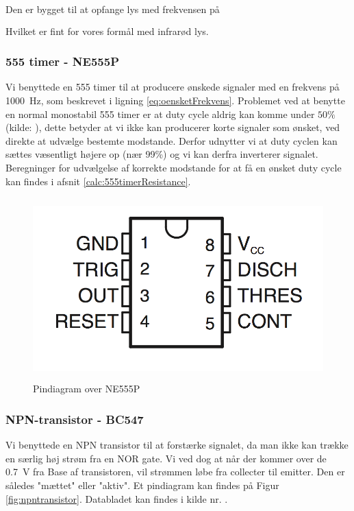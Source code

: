Den er bygget til at opfange lys med frekvensen på
\begin{align}
	 [\SI{730}{nm};\SI{1100}{nm}] \\
\end{align}
Hvilket er fint for vores formål med infrarød lys.
\subsubsection{555 timer - NE555P}
Vi benyttede en 555 timer\cite{komp555} til at producere ønskede signaler med en frekvens på \SI{1000}{Hz}, som beskrevet i ligning \ref{eq:oensketFrekvens}.
Problemet ved at benytte en normal monostabil 555 timer er at duty cycle aldrig kan komme under $50\%$ (kilde: \cite{555timer50percent}), dette betyder at vi ikke kan producerer korte signaler som ønsket, ved direkte at udvælge bestemte modstande. Derfor udnytter vi at duty cyclen kan sættes væsentligt højere op (nær 99\%) og vi kan derfra inverterer signalet. Beregninger for udvælgelse af korrekte modstande for at få en ønsket duty cycle kan findes i afsnit \ref{calc:555timerResistance}.

\begin{figure}[H]
	\centering
    \includegraphics[height=7cm]{figures/2_4_4hastighedsmaal/komp555pin.png}
	\caption{Pindiagram over NE555P}
	\label{fig:komp555pin}
\end{figure}

\subsubsection{NPN-transistor - BC547}
Vi benyttede en NPN transistor til at forstærke signalet, da man ikke kan trække en særlig høj strøm fra en NOR gate. Vi ved dog at når der kommer over de \SI{0.7}{V} fra Base af transistoren, vil strømmen løbe fra collecter til emitter. Den er således "mættet" eller "aktiv". Et pindiagram kan findes på Figur \ref{fig:npntransistor}.
Databladet kan findes i kilde nr. \cite{NPNtransistorKomp}.

